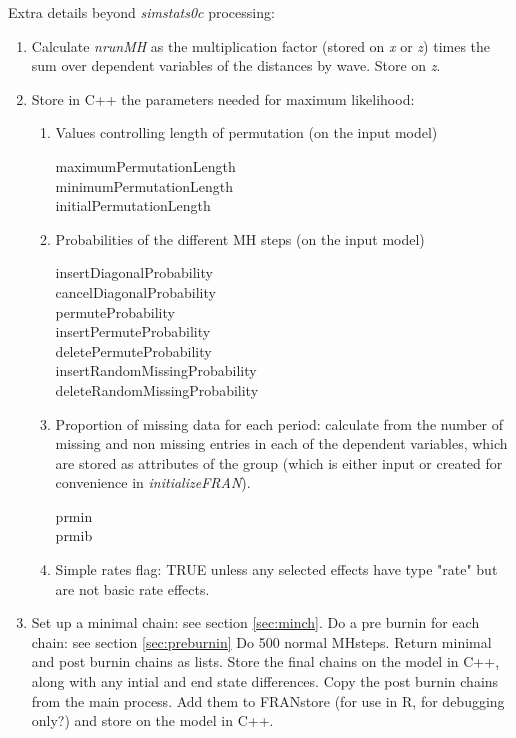 \documentclass[12pt,a4paper]{article}
\renewcommand{\=}{\,=\,}
\newcommand{\+}{\,+\,}
\newcommand{\nnm}[1]{\textsf{\small\textit{#1}}}
\begin{document}
Extra details beyond \nnm{simstats0c} processing:
\begin{enumerate}
\item Calculate \nnm{nrunMH} as the multiplication factor (stored on \nnm{x} or
  \nnm{z}) times the sum over dependent variables of the distances by
  wave. Store on \nnm{z}.
\item Store in C++ the parameters needed for maximum likelihood:
\begin{enumerate}
\item Values controlling length of permutation (on the input model)
\begin{description}
\item[maximumPermutationLength]
\item[minimumPermutationLength]
\item[initialPermutationLength]
\end{description}
\item Probabilities of the different MH steps (on the input model)
\begin{description}
\item[insertDiagonalProbability]
\item[cancelDiagonalProbability]
\item[permuteProbability]
\item[insertPermuteProbability]
\item[deletePermuteProbability]
\item[insertRandomMissingProbability]
\item[deleteRandomMissingProbability]
\end{description}
\item Proportion of missing data for each period: calculate from the number of
  missing and non missing entries in each of the dependent variables, which are
  stored as attributes of the group (which is either input or created for
  convenience in \nnm{initializeFRAN}).
\begin{description}
\item[prmin]
\item[prmib]
\end{description}
\item Simple rates flag: TRUE unless any selected effects have type "rate" but
  are not basic rate effects.
\end{enumerate}
\item
\begin{algorithmic}
\STATE Set up a minimal chain: see section \ref{sec:minch}.
\STATE Do a pre burnin for each chain: see section \ref{sec:preburnin}
\STATE Do 500 normal MHsteps.
\STATE Return minimal and post burnin chains as lists.
\STATE Store the final chains on the model in C++, along with any intial and
end state differences.
\ELSE
\STATE Copy the post burnin chains from the main process. Add them to
 FRANstore (for use in R, for debugging only?) and store on the model in C++.
\ENDIF
\end{algorithmic}
\end{enumerate}
\end{document}
